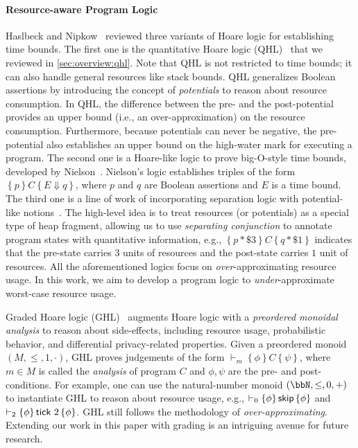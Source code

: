 \paragraph*{Resource-aware Program Logic}
%
Haslbeck and Nipkow~\cite{TACAS:HN18} reviewed three variants of Hoare logic for establishing time bounds.
%
The first one is the quantitative Hoare logic (QHL)~\cite{PLDI:CHR14,PLDI:CHS15} that we reviewed in \cref{sec:overview:qhl}.
%
Note that QHL is not restricted to time bounds; it can also handle general resources like stack bounds.
%
QHL generalizes Boolean assertions by introducing the concept of \emph{potentials} to reason about resource consumption.
%
In QHL, the difference between the pre- and the post-potential provides an upper bound (i.e., an over-approximation) on the resource consumption.
%
Furthermore, because potentials can never be negative, the pre-potential also establishes an upper bound on the high-water mark for executing a program.
%
The second one is a Hoare-like logic to prove big-O-style time bounds, developed by Nielson~\cite{SCP:Nielson87}.
%
Nielson's logic establishes triples of the form $\left\{p\right\} C \left\{ E \Downarrow q \right\}$, where $p$ and $q$ are Boolean assertions and $E$ is a time bound.
%
The third one is a line of work of incorporating separation logic with potential-like notions~\cite{ESOP:Atkey10,ESOP:MJP19,POPL:PGJ24}.
%
The high-level idea is to treat resources (or potentials) as a special type of heap fragment, allowing us to use \emph{separating conjunction} to annotate program states with quantitative information, e.g., $\left\{p \ast \$3\right\} C \left\{ q \ast \$1 \right\}$ indicates that the pre-state carries $3$ units of resources and the post-state carries $1$ unit of resources.
%
All the aforementioned logics focus on \emph{over}-approximating resource usage.
%
In this work, we aim to develop a program logic to \emph{under}-approximate worst-case resource usage.

Graded Hoare logic (GHL)~\cite{ESOP:GKO21} augments Hoare logic with a \emph{preordered monoidal analysis} to reason about side-effects, including resource usage, probabilistic behavior, and differential privacy-related properties.
%
Given a preordered monoid $(M,{\le},1,{\cdot})$, GHL proves judgements of the form $\vdash_m \left\{ \phi \right\} C \left\{ \psi \right\}$, where $m \in M$ is called the \emph{analysis} of program $C$ and $\phi,\psi$ are the pre- and post-conditions.
%
For example, one can use the natural-number monoid $(\bbN,{\le},0,{+})$ to instantiate GHL to reason about resource usage, e.g., $\vdash_0 \left\{\phi\right\} \textsf{skip} \left\{\phi\right\}$ and $\vdash_2 \left\{\phi\right\} \textsf{tick}~2 \left\{\phi\right\}$.
%
GHL still follows the methodology of \emph{over-approximating}.
%
Extending our work in this paper with grading is an intriguing avenue for future research.

